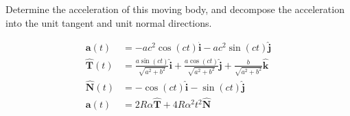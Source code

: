 Determine the acceleration of this moving body, and decompose the acceleration into the unit tangent and unit normal directions.

\begin{solution}
\begin{align*}
    \boldsymbol{a}(t) &= -ac^2\cos(ct) \hat{\boldsymbol{i}} - ac^2\sin(ct) \hat{\boldsymbol{j}} \\
    \boldsymbol{\hat{T}}(t) &= \frac{a\sin(ct)}{\sqrt{a^2+b^2}} \hat{\boldsymbol{i}} + \frac{a\cos(ct)}{\sqrt{a^2+b^2}} \hat{\boldsymbol{j}} + \frac{b}{\sqrt{a^2+b^2}} \hat{\boldsymbol{k}} \\
    \boldsymbol{\hat{N}}(t) &= -\cos(ct) \hat{\boldsymbol{i}} - \sin(ct) \hat{\boldsymbol{j}} \\
    \boldsymbol{a}(t) &= 2R\alpha \boldsymbol{\hat{T}} + 4R\alpha^2t^2 \boldsymbol{\hat{N}}
\end{align*}
\end{solution}